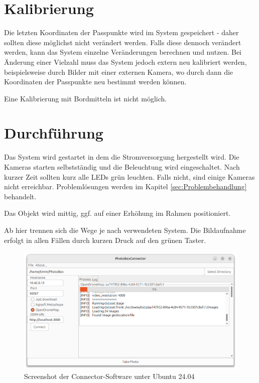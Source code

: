 \documentclass[./00PhotoBox.tex]{subfiles}
\begin{document}
\section{Kalibrierung}
Die letzten Koordinaten der Passpunkte wird im System gespeichert - daher sollten diese möglichst nicht verändert werden. Falls diese dennoch verändert werden, kann das System einzelne Veränderungen berechnen und nutzen. Bei Änderung einer Vielzahl muss das System jedoch extern neu kalibriert werden, beispielsweise durch Bilder mit einer externen Kamera, wo durch dann die Koordinaten der Passpunkte neu bestimmt werden können.

Eine Kalibrierung mit Bordmitteln ist nicht möglich.

\section{Durchführung}
Das System wird gestartet in dem die Stromversorgung hergestellt wird. Die Kameras starten selbstständig und die Beleuchtung wird eingeschaltet. Nach kurzer Zeit sollten kurz alle LEDs grün leuchten. Falls nicht, sind einige Kameras nicht erreichbar. Problemlösungen werden im Kapitel \autoref{sec:Problembehandlung} behandelt.

Das Objekt wird mittig, ggf. auf einer Erhöhung im Rahmen positioniert.

Ab hier trennen sich die Wege je nach verwendeten System. Die Bildaufnahme erfolgt in allen Fällen durch kurzen Druck auf den grünen Taster.

\begin{figure}
    \centering
    \includegraphics[width=1\textwidth]{./img/connector_screenshot.png}
    \centering
    \caption{Screenshot der Connector-Software unter Ubuntu 24.04} %
    \label{img:connector} %
\end{figure}
\end{document}
